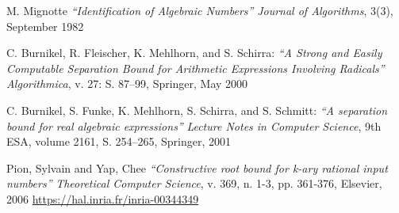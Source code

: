 %
%
\pagebreak
\begin{thebibliography}{----}

M. Mignotte
\textit{“Identification of Algebraic Numbers”}
\textit{Journal of Algorithms},
3(3), September 1982

C. Burnikel, R. Fleischer, K. Mehlhorn, and S. Schirra:
\textit{“A Strong and Easily Computable Separation Bound for
Arithmetic Expressions Involving Radicals”}
\textit{Algorithmica},
v. 27: S. 87–99, Springer, May 2000

C. Burnikel, S. Funke, K. Mehlhorn, S. Schirra, and S. Schmitt:
\textit{“A separation bound for real algebraic expressions”}
\textit{Lecture Notes in Computer Science},
9th ESA, volume 2161, S. 254–265, Springer, 2001

Pion, Sylvain and Yap, Chee
\textit{“Constructive root bound for k-ary rational input numbers”}
\textit{Theoretical Computer Science},
v. 369, n. 1-3, pp. 361-376, Elsevier, 2006 \url{https://hal.inria.fr/inria-00344349}

\end{thebibliography}
%
%
